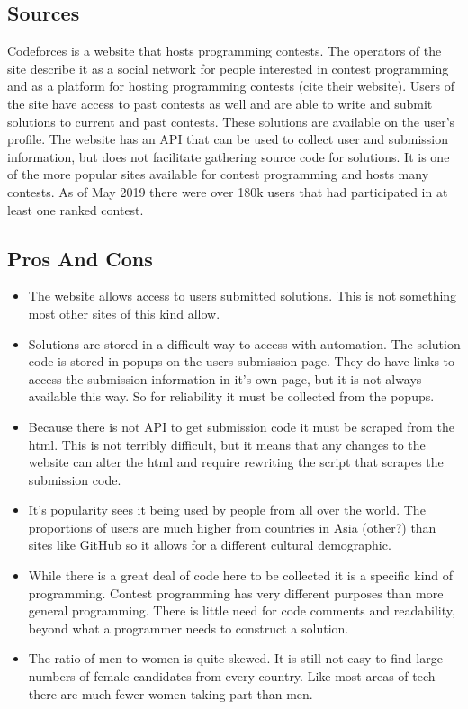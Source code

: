 \documentclass{article}
\begin{document}
\subsection{Sources}
Codeforces is a website that hosts programming contests. The operators of the site describe it as a social network for people interested in contest programming and as a platform for hosting programming contests (cite their website). Users of the site have access to past contests as well and are able to write and submit solutions to current and past contests. These solutions are available on the user's profile. The website has an API that can be used to collect user and submission information, but does not facilitate gathering source code for solutions. It is one of the more popular sites available for contest programming and hosts many contests. As of May 2019 there were over 180k users that had participated in at least one ranked contest.

\subsection{Pros And Cons}
\begin{itemize}
    \item The website allows access to users submitted solutions. This is not something most other sites of this kind allow. 

    \item Solutions are stored in a difficult way to access with automation. The solution code is stored in popups on the users submission page. They do have links to access the submission information in it's own page, but it is not always available this way. So for reliability it must be collected from the popups.

    \item Because there is not API to get submission code it must be scraped from the html. This is not terribly difficult, but it means that any changes to the website can alter the html and require rewriting the script that scrapes the submission code.

    \item It's popularity sees it being used by people from all over the world. The proportions of users are much higher from countries in Asia (other?) than sites like GitHub so it allows for a different cultural demographic.

    \item While there is a great deal of code here to be collected it is a specific kind of programming. Contest programming has very different purposes than more general programming. There is little need for code comments and readability, beyond what a programmer needs to construct a solution.

    \item The ratio of men to women is quite skewed. It is still not easy to find large numbers of female candidates from every country. Like most areas of tech there are much fewer women taking part than men.
\end{itemize}
\end{document}
